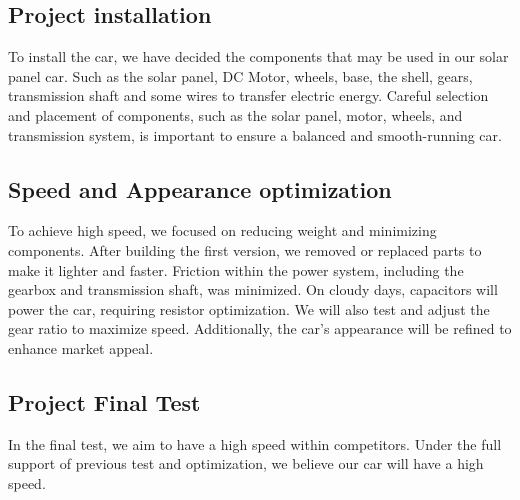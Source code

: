 \documentclass[12pt]{article}
\begin{document}
\subsection{Project installation}
\label{sec:installation}
To install the car, we have decided the components that may be used in our solar panel car.
Such as the solar panel, DC Motor, wheels, base, the shell, gears, transmission shaft and some wires to transfer electric energy. 
Careful selection and placement of components, such as the solar panel, motor, wheels, and transmission system, is important to ensure a balanced and smooth-running car\cite{Hapuwatte2017}. 
\subsection{Speed and Appearance optimization}
\label{sec:Optimization}  
To achieve high speed, we focused on reducing weight and minimizing components. After building the first version, we removed or replaced parts to make it lighter and faster. 
Friction within the power system, including the gearbox and transmission shaft, was minimized. 
On cloudy days, capacitors will power the car, requiring resistor optimization. 
We will also test and adjust the gear ratio to maximize speed. Additionally, the car's appearance will be refined to enhance market appeal.

\subsection{Project Final Test}
In the final test, we aim to have a high speed within competitors. Under the full support of previous test and optimization, we believe our car will have a high speed.
\end{document}
